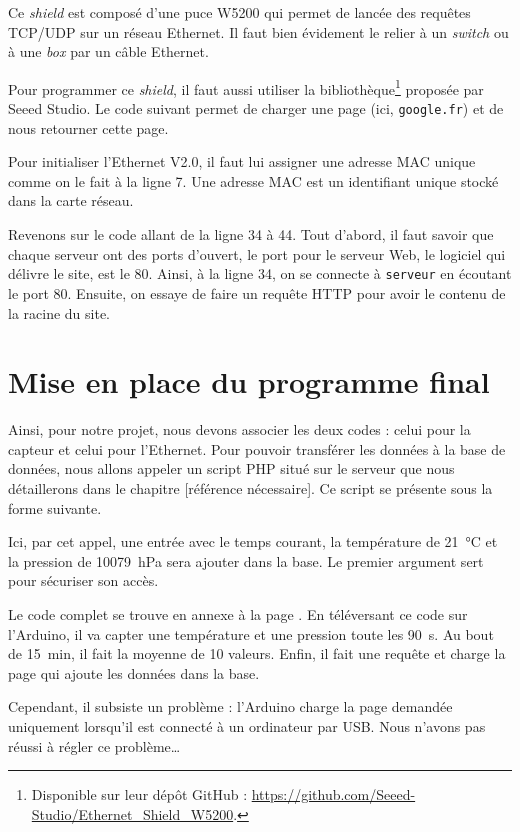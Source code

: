 Ce \emph{shield} est composé d'une puce W5200 qui permet de lancée des requêtes TCP/UDP sur un réseau Ethernet. Il faut bien évidement le relier à un \emph{switch} ou à une \emph{box} par un câble Ethernet.

Pour programmer ce \emph{shield}, il faut aussi utiliser la bibliothèque\footnote{Disponible sur leur dépôt GitHub : \url{https://github.com/Seeed-Studio/Ethernet_Shield_W5200}.} proposée par Seeed Studio. Le code suivant permet de charger une page (ici, \verb-google.fr-) et de nous retourner cette page.


Pour initialiser l'Ethernet V2.0, il faut lui assigner une adresse MAC unique comme on le fait à la ligne 7. Une adresse MAC est un identifiant unique stocké dans la carte réseau.

Revenons sur le code allant de la ligne 34 à 44. Tout d'abord, il faut savoir que chaque serveur ont des ports d'ouvert, le port pour le serveur Web, le logiciel qui délivre le site, est le 80. Ainsi, à la ligne 34, on se connecte à \verb-serveur- en écoutant le port 80. Ensuite, on essaye de faire un requête HTTP pour avoir le contenu de la racine du site.

\section{Mise en place du programme final}

Ainsi, pour notre projet, nous devons associer les deux codes : celui pour la capteur et celui pour l'Ethernet. Pour pouvoir transférer les données à la base de données, nous allons appeler un script PHP situé sur le serveur que nous détaillerons dans le chapitre [référence nécessaire]. Ce script se présente sous la forme suivante.


Ici, par cet appel, une entrée avec le temps courant, la température de \SI{21}{\celsius} et la pression de \SI{10079}{\hecto\pascal} sera ajouter dans la base. Le premier argument sert pour sécuriser son accès.

\Espace

Le code complet se trouve en annexe à la page \pageref{code:arduino}. En téléversant ce code sur l'Arduino, il va capter une température et une pression toute les \SI{90}{\second}. Au bout de \SI{15}{\minute}, il fait la moyenne de 10 valeurs. Enfin, il fait une requête et charge la page qui ajoute les données dans la base.

Cependant, il subsiste un problème : l'Arduino charge la page demandée uniquement lorsqu'il est connecté à un ordinateur par USB. Nous n'avons pas réussi à régler ce problème\dots
